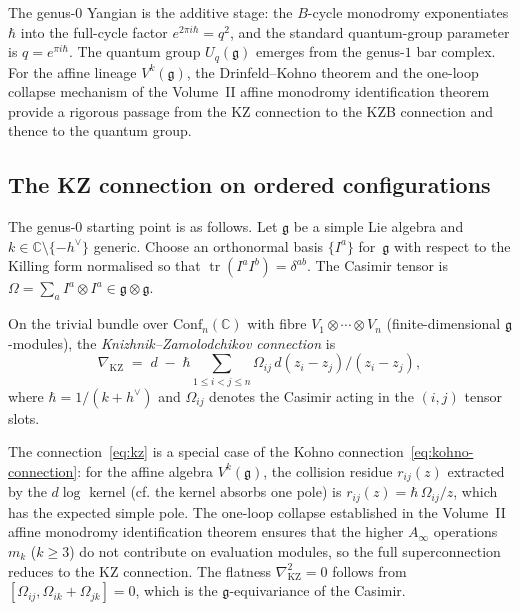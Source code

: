 The genus-$0$ Yangian is the additive stage: the $B$-cycle
monodromy exponentiates $\hbar$ into the full-cycle factor
$e^{2\pi i\hbar} = q^2$, and the standard quantum-group parameter is
$q = e^{\pi i\hbar}$. The
quantum group $U_q(\mathfrak{g})$ emerges from the genus-$1$ bar
complex. For the affine lineage $V^k(\mathfrak{g})$, the
Drinfeld--Kohno theorem and the one-loop collapse mechanism of the
Volume~II affine monodromy identification theorem
provide a rigorous passage from the KZ connection to the KZB connection
and thence to the quantum group.

\subsection{The KZ connection on ordered configurations}
\label{sec:kz-connection}

The genus-$0$ starting point is as follows. Let $\mathfrak{g}$ be a simple
Lie algebra and $k \in \mathbb{C} \setminus \{-h^\vee\}$ generic.
Choose an orthonormal basis $\{I^a\}$ for~$\mathfrak{g}$ with respect
to the Killing form normalised so that
$\operatorname{tr}(I^a I^b) = \delta^{ab}$. The Casimir tensor is
$\Omega = \sum_a I^a \otimes I^a \in \mathfrak{g} \otimes \mathfrak{g}$.

\begin{definition}[KZ connection]
\ClaimStatusProvedHere
\label{def:kz-connection}
On the trivial bundle over $\mathrm{Conf}_n(\mathbb{C})$ with fibre
$V_1 \otimes \cdots \otimes V_n$ (finite-dimensional
$\mathfrak{g}$-modules), the \emph{Knizhnik--Zamolodchikov connection}
is
\begin{equation}\label{eq:kz}
\nabla_{\mathrm{KZ}}
\;=\;
d
\;-\;
\hbar
\sum_{1 \leq i < j \leq n}
\Omega_{ij}\,d(z_i - z_j)/(z_i - z_j),
\end{equation}
where $\hbar = 1/(k + h^\vee)$ and $\Omega_{ij}$ denotes the
Casimir acting in the $(i,j)$ tensor slots.
\end{definition}

\begin{remark}
The connection~\eqref{eq:kz} is a special case of the Kohno
connection~\eqref{eq:kohno-connection}: for the affine algebra
$V^k(\mathfrak{g})$, the collision residue $r_{ij}(z)$ extracted by
the $d\log$ kernel (cf.\: the kernel absorbs one pole) is
$r_{ij}(z) = \hbar\,\Omega_{ij}/z$, which has the expected
simple pole.
The one-loop collapse established in the Volume~II affine monodromy
identification theorem
ensures that the higher $A_\infty$ operations $m_k$ ($k \geq 3$) do not
contribute on evaluation modules, so the full superconnection reduces to
the KZ connection. The flatness $\nabla_{\mathrm{KZ}}^2 = 0$ follows
from $[\Omega_{ij}, \Omega_{ik} + \Omega_{jk}] = 0$, which is the
$\mathfrak{g}$-equivariance of the Casimir.
\end{remark}

